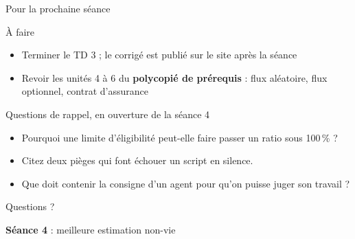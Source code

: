 \documentclass[10pt,aspectratio=169]{beamer}
\begin{document}
\begin{frame}{Pour la prochaine séance}
\begin{block}{À faire}
\begin{itemize}
  \item Terminer le TD 3 ; le corrigé est publié sur le site après la séance
  \item Revoir les unités 4 à 6 du \textbf{polycopié de prérequis} : flux aléatoire, flux optionnel, contrat d'assurance
\end{itemize}
\end{block}
\begin{block}{Questions de rappel, en ouverture de la séance 4}
\begin{itemize}
  \item Pourquoi une limite d'éligibilité peut-elle faire passer un ratio sous 100\,\% ?
  \item Citez deux pièges qui font échouer un script en silence.
  \item Que doit contenir la consigne d'un agent pour qu'on puisse juger son travail ?
\end{itemize}
\end{block}
\end{frame}

\begin{frame}[c]
\centering
\Huge Questions ?

\vspace{1cm}
\Large
\textbf{Séance 4} : meilleure estimation non-vie
\end{frame}
\end{document}
